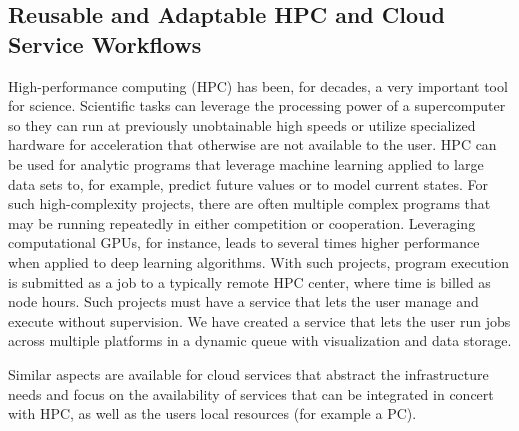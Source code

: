 \subsection{Reusable and Adaptable HPC and Cloud Service Workflows}

High-performance computing (HPC) has been, for decades, a very important tool
for science. Scientific tasks can leverage the processing power of
a supercomputer so they can run at previously unobtainable high speeds
or utilize specialized hardware for acceleration that otherwise are not
available to the user. HPC can be used for analytic programs that
leverage machine learning applied to large data sets to, for example,
predict future values or to model current states. For such
high-complexity projects, there are often multiple complex programs that
may be running repeatedly in either competition or cooperation.
Leveraging computational GPUs, for instance, leads to several times higher
performance when applied to deep learning algorithms. With such
projects, program execution is submitted as a job to a typically remote
HPC center, where time is billed as node hours. Such projects must have
a service that lets the user manage and execute without supervision. We
have created a service that lets the user run jobs across multiple
platforms in a dynamic queue with visualization and data storage.

Similar aspects are available for cloud services that abstract the infrastructure needs and focus on the availability of services that can be integrated in concert with HPC, as well as the users local resources (for example a PC).


